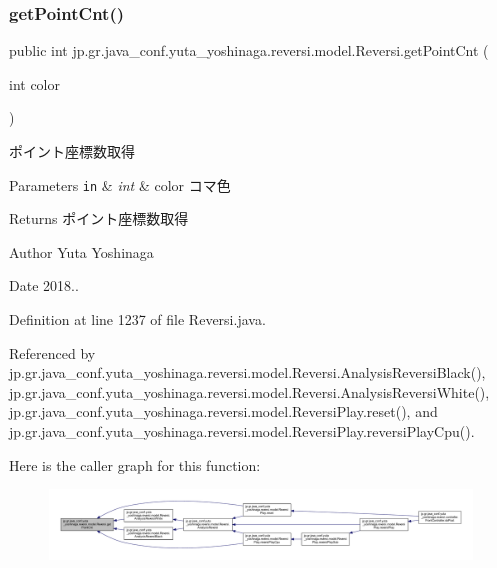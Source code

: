 \subsubsection{\texorpdfstring{get\+Point\+Cnt()}{getPointCnt()}}
{\footnotesize\ttfamily public int jp.\+gr.\+java\+\_\+conf.\+yuta\+\_\+yoshinaga.\+reversi.\+model.\+Reversi.\+get\+Point\+Cnt (\begin{DoxyParamCaption}\item[{int}]{color }\end{DoxyParamCaption})}



ポイント座標数取得 


\begin{DoxyParams}[1]{Parameters}
\mbox{\tt in}  & {\em int} & color コマ色 \\
\hline
\end{DoxyParams}
\begin{DoxyReturn}{Returns}
ポイント座標数取得 
\end{DoxyReturn}
\begin{DoxyAuthor}{Author}
Yuta Yoshinaga 
\end{DoxyAuthor}
\begin{DoxyDate}{Date}
2018.. 
\end{DoxyDate}


Definition at line 1237 of file Reversi.\+java.



Referenced by jp.\+gr.\+java\+\_\+conf.\+yuta\+\_\+yoshinaga.\+reversi.\+model.\+Reversi.\+Analysis\+Reversi\+Black(), jp.\+gr.\+java\+\_\+conf.\+yuta\+\_\+yoshinaga.\+reversi.\+model.\+Reversi.\+Analysis\+Reversi\+White(), jp.\+gr.\+java\+\_\+conf.\+yuta\+\_\+yoshinaga.\+reversi.\+model.\+Reversi\+Play.\+reset(), and jp.\+gr.\+java\+\_\+conf.\+yuta\+\_\+yoshinaga.\+reversi.\+model.\+Reversi\+Play.\+reversi\+Play\+Cpu().

Here is the caller graph for this function\+:\nopagebreak
\begin{figure}[H]
\begin{center}
\leavevmode
\includegraphics[width=350pt]{classjp_1_1gr_1_1java__conf_1_1yuta__yoshinaga_1_1reversi_1_1model_1_1_reversi_a8ab289d67a725a30e92411c90b755bd8_icgraph}
\end{center}
\end{figure}
\mbox{\label{classjp_1_1gr_1_1java__conf_1_1yuta__yoshinaga_1_1reversi_1_1model_1_1_reversi_a9929ed36140ddc25923ede99f86564c3}} 

